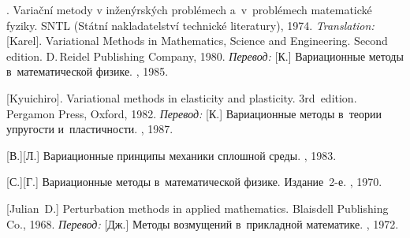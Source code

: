 \begin{thebibliography}{123}
\begin{otherlanguage}{russian}

. Varia\v{c}ní metody v in\v{z}en\'{y}rsk\'{y}ch probl\'{e}mech a~v~pro\-bl\'{e}\-mech matematick\'{e} fyziky. SNTL (St\'{a}tní nakladatelství technick\'{e} literatury), 1974. 
\emph{Translation:}
[Karel]. Variational Methods in Mathematics, Science and Engineering. Second edition. D.\,Reidel Publishing Company, 1980. 
\emph{Перевод:}
[К.] Вариационные методы в~математической физике. \mirpublisher, 1985. 

[Kyuichiro]. Variational methods in elasticity and plasticity. 3rd~edition. Pergamon Press, Oxford, 1982. 
\emph{Перевод:} [К.] Вариационные методы в~теории упругости и~пластичности. \mirpublisher, 1987. 

[В.][Л.] Вариационные принципы механики сплошной среды. \naukapublisher, 1983. 

[С.][Г.] Вариационные методы в~математической физике. Издание~2\hbox{-}е. \naukapublisher, 1970. 

%
%



[Julian~D.] Perturbation methods in applied mathematics. Blaisdell Publishing Co., 1968. 
\emph{Перевод:} [Дж.] Методы возмущений в~прикладной математике. \mirpublisher, 1972. 


\end{otherlanguage}
\end{thebibliography}
